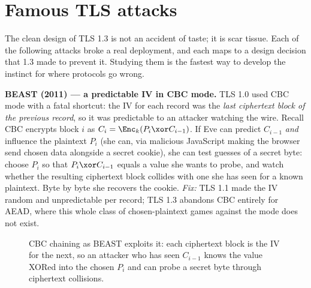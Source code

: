 \section{Famous TLS attacks}

The clean design of TLS 1.3 is not an accident of taste; it is scar tissue. Each
of the following attacks broke a real deployment, and each maps to a design
decision that 1.3 made to prevent it. Studying them is the fastest way to develop
the instinct for where protocols go wrong.

\begin{attackbox}
\textbf{BEAST (2011) --- a predictable IV in CBC mode.} TLS 1.0 used CBC mode with a
fatal shortcut: the IV for each record was the \emph{last ciphertext block of the
previous record}, so it was predictable to an attacker watching the wire. Recall
CBC encrypts block $i$ as $C_i = \Enc_k(P_i \xor C_{i-1})$. If Eve can predict
$C_{i-1}$ \emph{and} influence the plaintext $P_i$ (she can, via malicious
JavaScript making the browser send chosen data alongside a secret cookie), she can
test guesses of a secret byte: choose $P_i$ so that $P_i \xor C_{i-1}$ equals a
value she wants to probe, and watch whether the resulting ciphertext block collides
with one she has seen for a known plaintext. Byte by byte she recovers the cookie.
\emph{Fix:} TLS 1.1 made the IV random and unpredictable per record; TLS 1.3
abandons CBC entirely for AEAD, where this whole class of chosen-plaintext games
against the mode does not exist.
\end{attackbox}

\begin{figure}[H]
\centering
{}
\caption{CBC chaining as BEAST exploits it: each ciphertext block is the IV for
the next, so an attacker who has seen $C_{i-1}$ knows the value XORed into the
chosen $P_i$ and can probe a secret byte through ciphertext collisions.}
\label{ch25:beast-cbc}
\end{figure}

